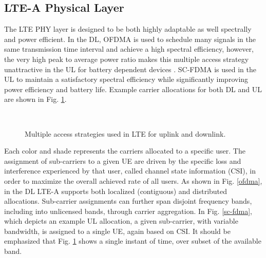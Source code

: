 \subsection{LTE-A Physical Layer}
\label{lte-phy}
The LTE PHY layer is designed to be both highly adaptable as well spectrally and power efficient.  In the DL, OFDMA is used to schedule many signals in the same transmission time interval and achieve a high spectral efficiency, however, the very high peak to average power ratio makes this multiple access strategy unattractive in the UL for battery dependent devices \cite{tr36201}\cite{tr36211}.  SC-FDMA is used in the UL to maintain a satisfactory spectral efficiency while significantly improving power efficiency and battery life. Example carrier allocations for both DL and UL are shown in Fig. \ref{lte:of-sc-fdma}.
\begin{figure}[!ht] 	
	\\
	\caption{Multiple access strategies used in LTE for uplink and downlink.}
	\label{lte:of-sc-fdma}
\end{figure}
Each color and shade represents the carriers allocated to a specific user.  The assignment of sub-carriers to a given UE are driven by the specific loss and interference experienced by that user, called channel state information (CSI), in order to maximize the overall achieved rate of all users.  As shown in Fig. \ref{ofdma}, in the DL LTE-A supports both localized (contiguous) and distributed allocations. Sub-carrier assignments can further span disjoint frequency bands, including into unlicensed bands, through carrier aggregation.  In Fig. \ref{sc-fdma}, which depicts an example UL allocation, a given sub-carrier, with variable bandwidth, is assigned to a single UE, again based on CSI.  It should be emphasized that Fig. \ref{lte:of-sc-fdma} shows a single instant of time, over subset of the available band. 

